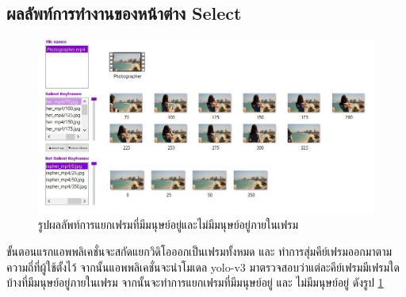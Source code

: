 \subsection*{ผลลัพท์การทำงานของหน้าต่าง Select}
\begin{figure}[!ht]
  \centering
    \includegraphics[scale=0.6]{chapter4/images/Result/result_select3.jpg}
    \caption{รูปผลลัพท์การแยกเฟรมที่มีมนุษย์อยู่และไม่มีมนุษย์อยู่ภายในเฟรม}
    \label{fig:result_select}
\end{figure}
ขั้นตอนแรกแอพพลิเคชั่นจะสกัดแยกวิดิโอออกเป็นเฟรมทั้งหมด และ ทำการสุ่มคีย์เฟรมออกมาตามความถี่ที่ผู้ใช้ตั้งไว้ จากนั้นแอพพลิเคชั่นจะนำโมเดล yolo-v3 มาตรวจสอบว่าแต่ละคีย์เฟรมมีเฟรมใดบ้างที่มีมนุษย์อยู่ภายในเฟรม จากนั้นจะทำการแยกเฟรมที่มีมนุษย์อยู่ และ ไม่มีมนุษย์อยู่ ดังรูป \ref{fig:result_select}

